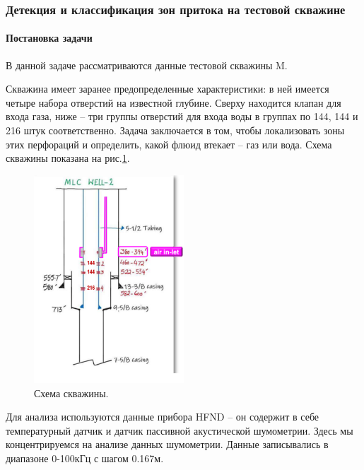\subsubsection{Детекция и классификация зон притока на тестовой скважине}

\paragraph{Постановка задачи}
\par
В данной задаче рассматриваются данные тестовой скважины M. 
\par
Скважина имеет заранее предопределенные характеристики: в ней имеется четыре набора отверстий на известной глубине. Сверху находится клапан для входа газа, ниже – три группы отверстий для входа воды в группах по 144, 144 и 216 штук соответственно. Задача заключается в том, чтобы локализовать зоны этих перфораций и определить, какой флюид втекает – газ или вода. Схема скважины показана на рис.\ref{fig:hfnd_scheme}.

\begin{figure}[H]
\centering
\includegraphics[width=0.5\textwidth]{PLT/hfnd_scheme.png}
\caption{Схема скважины.}
\label{fig:hfnd_scheme}
\end{figure}

\par
Для анализа используются данные прибора HFND – он содержит в себе температурный датчик и датчик пассивной акустической шумометрии. Здесь мы концентрируемся на анализе данных шумометрии. Данные записывались в диапазоне 0-100кГц с шагом 0.167м.


